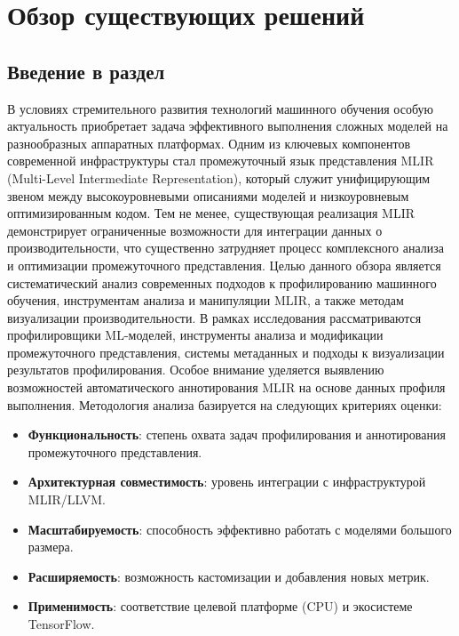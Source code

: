 \section{Обзор существующих решений}
\label{sec:Chapter2} 

\subsection{Введение в раздел}

В условиях стремительного развития технологий машинного обучения особую актуальность приобретает задача эффективного выполнения сложных моделей на разнообразных аппаратных платформах.
Одним из ключевых компонентов современной инфраструктуры стал промежуточный язык представления MLIR (Multi-Level Intermediate Representation), который служит унифицирующим звеном между высокоуровневыми описаниями моделей и низкоуровневым оптимизированным кодом.
Тем не менее, существующая реализация MLIR демонстрирует ограниченные возможности для интеграции данных о производительности, что существенно затрудняет процесс комплексного анализа и оптимизации промежуточного представления.
Целью данного обзора является систематический анализ современных подходов к профилированию машинного обучения, инструментам анализа и манипуляции MLIR, а также методам визуализации производительности. В рамках исследования рассматриваются профилировщики ML-моделей, инструменты анализа и модификации промежуточного представления, системы метаданных и подходы к визуализации результатов профилирования.
Особое внимание уделяется выявлению возможностей автоматического аннотирования MLIR на основе данных профиля выполнения.
Методология анализа базируется на следующих критериях оценки:

\begin{itemize}
\item \textbf{Функциональность}: степень охвата задач профилирования и аннотирования промежуточного представления.
\item \textbf{Архитектурная совместимость}: уровень интеграции с инфраструктурой MLIR/LLVM.
\item \textbf{Масштабируемость}: способность эффективно работать с моделями большого размера.
\item \textbf{Расширяемость}: возможность кастомизации и добавления новых метрик.
\item \textbf{Применимость}: соответствие целевой платформе (CPU) и экосистеме TensorFlow.
\end{itemize}

